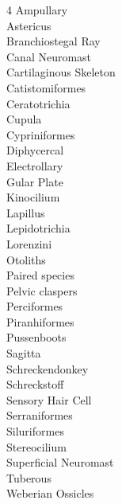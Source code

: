 
\begin{multicols}{4}
Ampullary \\
Astericus \\
Branchiostegal Ray \\
Canal Neuromast \\
Cartilaginous Skeleton \\
Catistomiformes \\
Ceratotrichia \\
Cupula \\
Cypriniformes \\
Diphycercal \\
Electrollary \\
Gular Plate \\
Kinocilium \\
Lapillus \\
Lepidotrichia \\
Lorenzini \\
Otoliths \\
Paired species \\
Pelvic claspers \\
Perciformes \\
Piranhiformes \\
Pussenboots \\
Sagitta \\
Schreckendonkey \\
Schreckstoff \\
Sensory Hair Cell \\
Serraniformes \\
Siluriformes \\
Stereocilium \\
Superficial Neuromast \\
Tuberous \\
Weberian Ossicles
\end{multicols}